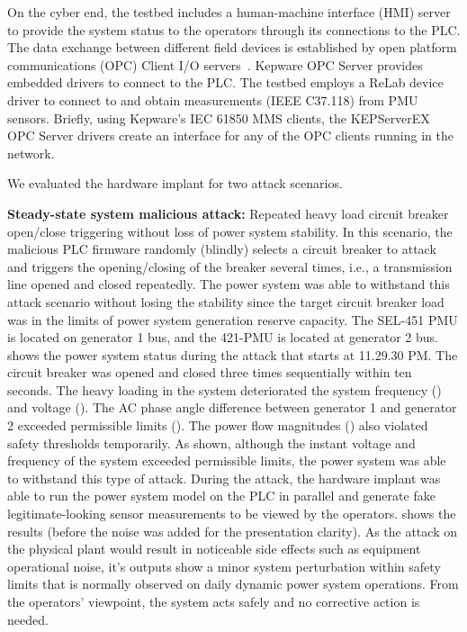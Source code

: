 On the cyber end, the testbed includes a human-machine interface (HMI) server to provide the system status to the operators through its connections to the PLC. The data exchange between different field devices is established by open platform communications (OPC) Client I/O servers~\cite{opc}. Kepware OPC Server provides embedded drivers to connect to the PLC. The testbed employs a ReLab device driver to connect to and obtain measurements (IEEE C37.118) from PMU sensors. Briefly, using Kepware’s IEC 61850 MMS clients, the KEPServerEX OPC Server drivers create an interface for any of the OPC clients running in the network. 

We evaluated the hardware implant for two attack scenarios. 

\noindent\textbf{Steady-state system malicious attack:} Repeated heavy load circuit breaker open/close triggering without loss of power system stability. In this scenario, the malicious PLC firmware randomly (blindly) selects a circuit breaker to attack and triggers the opening/closing of the breaker several times, i.e., a transmission line opened and closed repeatedly. The power system was able to withstand this attack scenario without losing the stability since the target circuit breaker load was in the limits of power system generation reserve capacity. The SEL-451 PMU is located on generator 1 bus, and the 421-PMU is located at generator 2 bus.  shows the power system status during the attack that starts at 11.29.30 PM. The circuit breaker was opened and closed three times sequentially within ten seconds. The heavy loading in the system deteriorated the system frequency () and voltage (). The AC phase angle difference between generator 1 and generator 2 exceeded permissible limits (). The power flow magnitudes () also violated safety thresholds temporarily. As shown, although the instant voltage and frequency of the system exceeded permissible limits, the power system was able to withstand this type of attack. During the attack, the hardware implant was able to run the power system model on the PLC in parallel and generate fake legitimate-looking sensor measurements to be viewed by the operators.  shows the results (before the noise was added for the presentation clarity). As the attack on the physical plant would result in noticeable side effects such as equipment operational noise, it's outputs show a minor system perturbation within safety limits that is normally observed on daily dynamic power system operations. From the operators' viewpoint, the system acts safely and no corrective action is needed.


